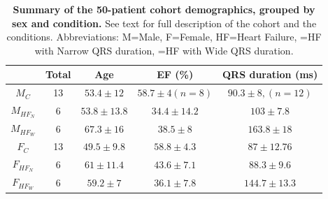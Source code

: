 \begin{table}[hbpt]
    \centering
    \caption[Summary of the 50-patient cohort demographics]{
        \textbf{Summary of the 50-patient cohort demographics, grouped by sex and condition. }
        See text for full description of the cohort and the conditions.
        Abbreviations: M=Male, F=Female, HF=Heart Failure, \HFN=HF with Narrow QRS duration, 
        \HFW=HF with Wide QRS duration.
    }
    \vspace{1em} 
    \begin{tabular}{c|cccc}
                   & Total  & Age            &  EF (\%)        & QRS duration (ms)\\
        \hline
        \hline 
        $M_C$      & 13 & $53.4\pm 12$   &  $58.7\pm 4 (n=8)$ & $90.3\pm 8, (n=12)$\\
        $M_{HF_N}$ &  6 & $53.8\pm 13.8$ & $34.4\pm 14.2$ & $103\pm 7.8$     \\
        $M_{HF_W}$ &  6 & $67.3\pm 16 $  & $38.5\pm 8$    & $163.8\pm 18 $   \\
        \hline 
        $F_C$      & 13 & $49.5\pm 9.8$  & $58.8\pm 4.3$  & $87\pm 1 2.76 $  \\
        $F_{HF_N}$ &  6 & $61\pm 11.4$   & $43.6\pm 7.1$  & $88.3\pm 9.6 $   \\
        $F_{HF_W}$ &  6 & $59.2\pm 7 $   & $36.1\pm7.8$   & $144.7\pm 13.3 $ \\
        \hline 
    \end{tabular}
    \label{tab:materials-demographics}
\end{table}
